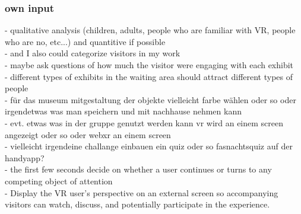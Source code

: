 \subsubsection{own input}
- qualitative analysis (children, adults, people who are familiar with VR, people who are no, etc...) and quantitive if possible
\\
- and I also could categorize visitors in my work
\\
- maybe ask questions of how much the visitor were engaging with each exhibit
\\
- different types of exhibits in the waiting area should attract different types of people
\\
- für das museum mitgestaltung der objekte vielleicht farbe wählen oder so oder irgendetwas was man speichern und mit nachhause nehmen kann
\\
- evt. etwas was in der gruppe genutzt werden kann vr wird an einem screen angezeigt oder so oder webxr an einem screen
\\
- vielleicht irgendeine challange einbauen ein quiz oder so fasnachtsquiz auf der handyapp?
\\
- the first few seconds decide on whether a user continues or turns to any competing object of attention
\\
- Display the VR user's perspective on an external screen so accompanying visitors can watch, discuss, and potentially participate in the experience.
